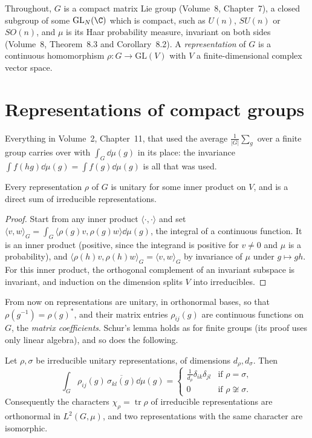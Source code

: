 Throughout, $G$ is a compact matrix Lie group (Volume~8, Chapter~7), a closed subgroup of some $\mathrm{GL}_N(\C)$ which is compact, such as $U(n)$, $SU(n)$ or $SO(n)$, and $\mu$ is its Haar probability measure, invariant on both sides (Volume~8, Theorem~8.3 and
Corollary~8.2). A \emph{representation} of $G$ is a continuous homomorphism $\rho:G\to\mathrm{GL}(V)$ with $V$ a finite-dimensional complex vector space.

\section{Representations of compact groups}

Everything in Volume~2, Chapter~11, that used the average $\frac1{|G|}\sum_g$ over a finite group carries over with $\int_G\dd\mu(g)$ in its place: the invariance $\int f(hg)\dd\mu(g)=\int f(g)\dd\mu(g)$ is all that was used.

\begin{proposition}\label{prop:unitarytrick}
Every representation $\rho$ of $G$ is unitary for some inner product on $V$, and is a direct sum of irreducible representations.
\end{proposition}

\begin{proof}
Start from any inner product $\langle\cdot,\cdot\rangle$ and set $\langle v,w\rangle_G=\int_G\langle\rho(g)v,\rho(g)w\rangle\dd\mu(g)$, the integral of a continuous function. It is an inner product (positive, since the integrand is positive for $v\ne0$ and $\mu$ is a
probability), and $\langle\rho(h)v,\rho(h)w\rangle_G=\langle v,w\rangle_G$ by invariance of $\mu$ under $g\mapsto gh$. For this inner product, the orthogonal complement of an invariant subspace is invariant, and induction on the dimension splits $V$ into irreducibles.
\end{proof}

From now on representations are unitary, in orthonormal bases, so that $\rho(g^{-1})=\rho(g)^*$, and their matrix entries $\rho_{ij}(g)$ are continuous functions on $G$, the \emph{matrix coefficients}. Schur's lemma holds as for finite groups (its proof uses only
linear algebra), and so does the following.

\begin{theorem}\label{thm:schurorth}
Let $\rho,\sigma$ be irreducible unitary representations, of dimensions $d_\rho,d_\sigma$. Then
\[
\int_G\rho_{ij}(g)\,\overline{\sigma_{kl}(g)}\dd\mu(g)=\begin{cases}\frac1{d_\rho}\delta_{ik}\delta_{jl}&\text{if }\rho=\sigma,\\0&\text{if }\rho\not\cong\sigma.\end{cases}
\]
Consequently the characters $\chi_\rho=\operatorname{tr}\rho$ of irreducible representations are orthonormal in $L^2(G,\mu)$, and two representations with the same character are isomorphic.
\end{theorem}

